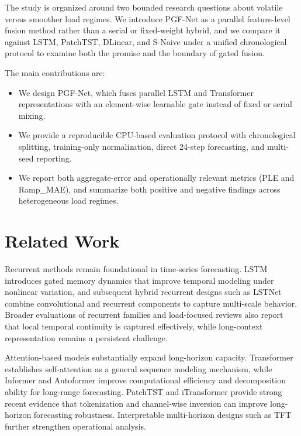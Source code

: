 \documentclass[pdflatex,sn-mathphys-num]{sn-jnl}
\theoremstyle{thmstyleone}
\theoremstyle{thmstyletwo}
\theoremstyle{thmstylethree}
\begin{document}
The study is organized around two bounded research questions about volatile versus smoother load regimes. We introduce PGF-Net as a parallel feature-level fusion method rather than a serial or fixed-weight hybrid, and we compare it against LSTM, PatchTST, DLinear, and S-Naive under a unified chronological protocol to examine both the promise and the boundary of gated fusion.

The main contributions are:
\begin{itemize}
\item We design PGF-Net, which fuses parallel LSTM and Transformer representations with an element-wise learnable gate instead of fixed or serial mixing.
\item We provide a reproducible CPU-based evaluation protocol with chronological splitting, training-only normalization, direct 24-step forecasting, and multi-seed reporting.
\item We report both aggregate-error and operationally relevant metrics (PLE and Ramp\_MAE), and summarize both positive and negative findings across heterogeneous load regimes.
\end{itemize}

\section{Related Work}

Recurrent methods remain foundational in time-series forecasting. LSTM \cite{hochreiter1997long} introduces gated memory dynamics that improve temporal modeling under nonlinear variation, and subsequent hybrid recurrent designs such as LSTNet \cite{lai2018modeling} combine convolutional and recurrent components to capture multi-scale behavior. Broader evaluations of recurrent families and load-focused reviews also report that local temporal continuity is captured effectively, while long-context representation remains a persistent challenge.\cite{chung2014empirical,hippert2001neural}

Attention-based models substantially expand long-horizon capacity. Transformer \cite{vaswani2017attention} establishes self-attention as a general sequence modeling mechanism, while Informer \cite{zhou2021informer} and Autoformer \cite{wu2021autoformer} improve computational efficiency and decomposition ability for long-range forecasting. PatchTST \cite{nie2023time} and iTransformer \cite{liu2023itransformer} provide strong recent evidence that tokenization and channel-wise inversion can improve long-horizon forecasting robustness. Interpretable multi-horizon designs such as TFT further strengthen operational analysis.\cite{lim2021temporal}
\end{document}
